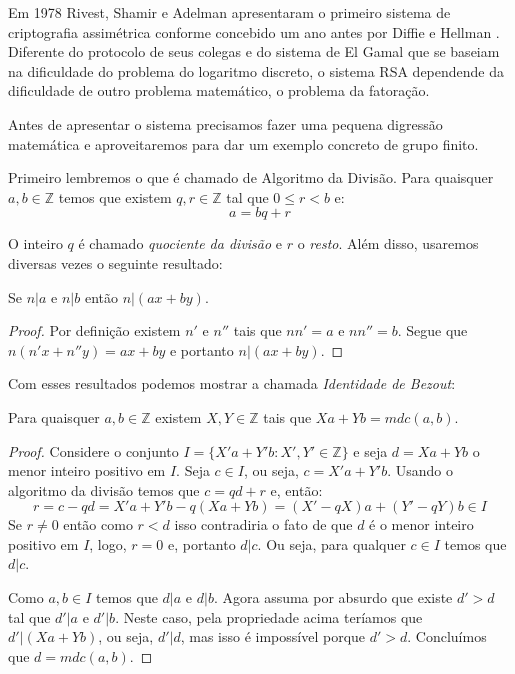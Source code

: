 Em 1978 Rivest, Shamir e Adelman apresentaram o primeiro sistema de criptografia assimétrica conforme concebido um ano antes por Diffie e Hellman \cite{Rivest78}.
Diferente do protocolo de seus colegas e do sistema de El Gamal que se baseiam na dificuldade do problema do logaritmo discreto, o sistema RSA dependende da dificuldade de outro problema matemático, o problema da fatoração.

Antes de apresentar o sistema precisamos fazer uma pequena digressão matemática e aproveitaremos para dar um exemplo concreto de grupo finito.

Primeiro lembremos o que é chamado de Algoritmo da Divisão.
Para quaisquer $a, b \in \mathbb{Z}$ temos que existem $q, r \in \mathbb{Z}$ tal que $0 \leq r < b$ e:
\begin{displaymath}
  a = bq + r
\end{displaymath}

O inteiro $q$ é chamado {\em quociente da divisão} e $r$ o {\em resto}.
Além disso, usaremos diversas vezes o seguinte resultado:

\begin{proposition}
Se $n|a$ e $n|b$ então $n|(ax + by)$.  
\end{proposition}
\begin{proof}
Por definição existem $n'$ e $n''$ tais que $nn' = a$ e $nn'' = b$.
Segue que $n(n'x + n''y) = ax + by$ e portanto $n|(ax + by)$.
\end{proof}

Com esses resultados podemos mostrar a chamada {\em Identidade de Bezout}:

\begin{proposition}
  Para quaisquer $a,b \in \mathbb{Z}$ existem $X, Y \in \mathbb{Z}$ tais que $Xa + Yb = mdc(a,b)$.
\end{proposition}
\begin{proof}
  Considere o conjunto $I = \{X'a + Y'b: X', Y' \in \mathbb{Z}\}$ e seja $d = Xa + Yb$ o menor inteiro positivo em $I$.
  Seja $c \in I$, ou seja, $c = X'a + Y'b$.
  Usando o algoritmo da divisão temos que $c = qd + r$ e, então:
  \begin{displaymath}
    r = c - qd = X'a + Y'b - q(Xa + Yb) = (X' - qX)a + (Y' - qY)b \in I
  \end{displaymath}
  Se $r \neq 0$ então como $r < d$ isso contradiria o fato de que $d$ é o menor inteiro positivo em $I$, logo, $r = 0$ e, portanto $d|c$.
  Ou seja, para qualquer $c \in I$ temos que $d|c$.
  
  Como $a, b \in I$ temos que $d|a$ e $d|b$.
  Agora assuma por absurdo que existe $d' > d$ tal que $d'|a$ e $d'|b$.
  Neste caso, pela propriedade acima teríamos que $d'|(Xa + Yb)$, ou seja, $d'|d$, mas isso é impossível porque $d' > d$.
  Concluímos que $d = mdc(a,b)$.
\end{proof}

